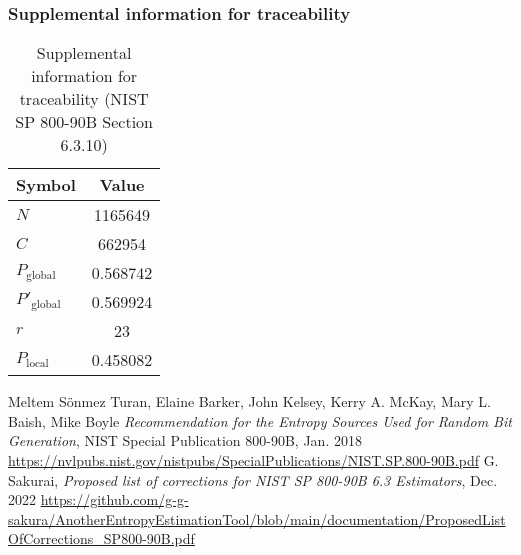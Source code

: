 \documentclass[a3paper,xelatex,english]{bxjsarticle}
\begin{document}
\subsubsection{Supplemental information for traceability}
\renewcommand{\arraystretch}{1.8}
\begin{table}[h]
\caption{Supplemental information for traceability (NIST SP 800-90B Section 6.3.10)}
\begin{center}
\begin{tabular}{|l|c|}
\hline 
\rowcolor{anotherlightblue} %
Symbol				& Value \\ \hline 
$N$				& 1165649\\ \hline 
$C$				& 662954\\ \hline 
$P_{\textrm{global}}$				& 0.568742\\ \hline 
$P'_{\textrm{global}}$			& 0.569924\\ \hline 
$r$				& 23\\ \hline 
$P_{\textrm{local}}$ 			& 0.458082\\ \hline
\end{tabular}
\end{center}
\end{table}
\renewcommand{\arraystretch}{1.4}
\begin{thebibliography}{99}
Meltem S\"{o}nmez Turan,
Elaine Barker,
John Kelsey,
Kerry A. McKay,
Mary L. Baish,
Mike Boyle
\textit{Recommendation for the Entropy Sources Used for Random Bit Generation},
NIST Special Publication 800-90B, Jan. 2018 
\url{https://nvlpubs.nist.gov/nistpubs/SpecialPublications/NIST.SP.800-90B.pdf}
G. Sakurai, \textit{Proposed list of corrections for NIST SP 800-90B 6.3 Estimators}, Dec. 2022 
\url{https://github.com/g-g-sakura/AnotherEntropyEstimationTool/blob/main/documentation/ProposedListOfCorrections_SP800-90B.pdf}
\end{thebibliography}
\end{document}
